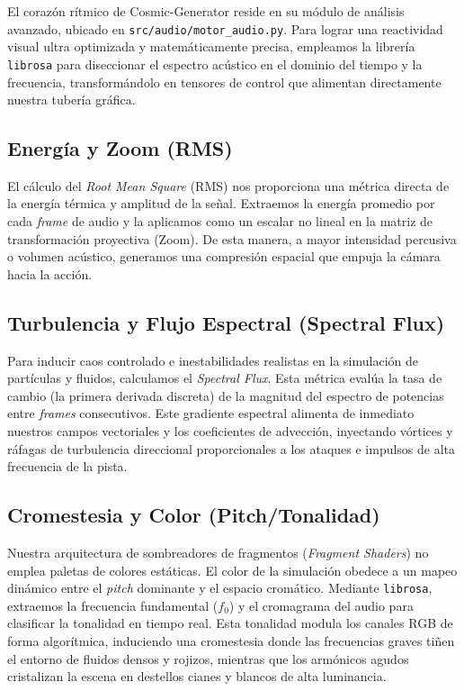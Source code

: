 \documentclass[12pt, openany]{book}
\begin{document}
El corazón rítmico de Cosmic-Generator reside en su módulo de análisis avanzado, ubicado en \texttt{src/audio/motor\_audio.py}. Para lograr una reactividad visual ultra optimizada y matemáticamente precisa, empleamos la librería \texttt{librosa} para diseccionar el espectro acústico en el dominio del tiempo y la frecuencia, transformándolo en tensores de control que alimentan directamente nuestra tubería gráfica.

\subsection{Energía y Zoom (RMS)}
El cálculo del \textit{Root Mean Square} (RMS) nos proporciona una métrica directa de la energía térmica y amplitud de la señal.
Extraemos la energía promedio por cada \textit{frame} de audio y la aplicamos como un escalar no lineal en la matriz de transformación proyectiva (Zoom). De esta manera, a mayor intensidad percusiva o volumen acústico, generamos una compresión espacial que empuja la cámara hacia la acción.

\subsection{Turbulencia y Flujo Espectral (Spectral Flux)}
Para inducir caos controlado e inestabilidades realistas en la simulación de partículas y fluidos, calculamos el \textit{Spectral Flux}. Esta métrica evalúa la tasa de cambio (la primera derivada discreta) de la magnitud del espectro de potencias entre \textit{frames} consecutivos.
Este gradiente espectral alimenta de inmediato nuestros campos vectoriales y los coeficientes de advección, inyectando vórtices y ráfagas de turbulencia direccional proporcionales a los ataques e impulsos de alta frecuencia de la pista.

\subsection{Cromestesia y Color (Pitch/Tonalidad)}
Nuestra arquitectura de sombreadores de fragmentos (\textit{Fragment Shaders}) no emplea paletas de colores estáticas. El color de la simulación obedece a un mapeo dinámico entre el \textit{pitch} dominante y el espacio cromático.
Mediante \texttt{librosa}, extraemos la frecuencia fundamental ($f_0$) y el cromagrama del audio para clasificar la tonalidad en tiempo real. Esta tonalidad modula los canales RGB de forma algorítmica, induciendo una cromestesia donde las frecuencias graves tiñen el entorno de fluidos densos y rojizos, mientras que los armónicos agudos cristalizan la escena en destellos cianes y blancos de alta luminancia.
\end{document}

